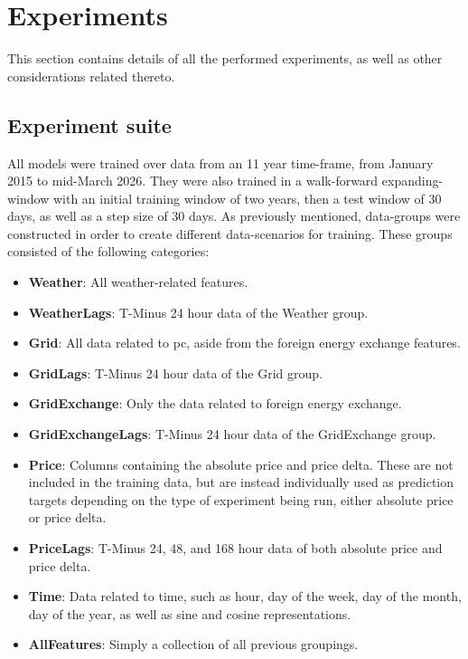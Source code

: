 \section{Experiments} \label{sec:experiments}
This section contains details of all the performed experiments, as well as 
other considerations related thereto.
\subsection{Experiment suite}\label{sec:experimentSuite}
All models were trained over data from an 11 year time-frame, from January 2015 
to mid-March 2026. They were also trained in a walk-forward expanding-window 
with 
an initial training window of two years, then a test window of 30 days, as well 
as a step size of 30 days. As previously mentioned, data-groups were 
constructed in 
order to create different data-scenarios for training. These groups consisted 
of the following categories: 
\begin{itemize}
	\item \textbf{Weather}: All weather-related features. 
	\item \textbf{WeatherLags}: T-Minus 24 hour data of the Weather group. 
	\item \textbf{Grid}: All data related to \gls{pc}, aside from the foreign 
	energy exchange features.
	\item \textbf{GridLags}: T-Minus 24 hour data of the Grid group. 
	\item \textbf{GridExchange}: Only the data related to foreign energy 
	exchange. 
	\item \textbf{GridExchangeLags}: T-Minus 24 hour data of the GridExchange 
	group. 
	\item \textbf{Price}: Columns containing the absolute price and price 
	delta. These are not included in the training data, but are instead 
	individually used as prediction targets depending on the type of experiment 
	being run, either absolute price or price delta. 
	\item \textbf{PriceLags}: T-Minus 24, 48, and 
	168 hour data of both absolute 
	price and price delta. 
	\item \textbf{Time}: Data related to time, such as hour, day of the week, 
	day of the month, day of the year, as well as sine and cosine 
	representations.
	\item \textbf{AllFeatures}: Simply a collection of all previous groupings.
\end{itemize}

